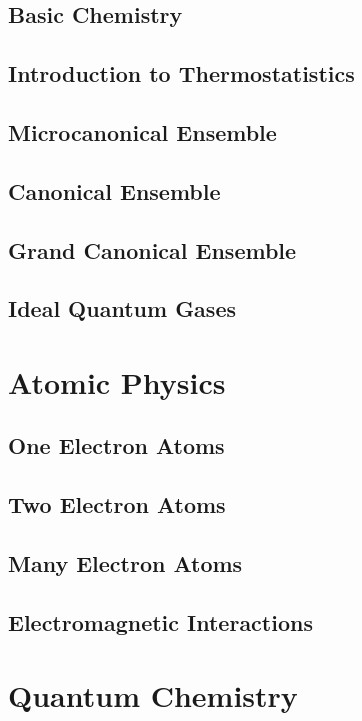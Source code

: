 \documentclass[a4paper, 11pt]{book}
\newcommand{\1}{\opr{\mathds{1}}}
\begin{document}
	\chapter{Basic Chemistry}
		
	\chapter{Introduction to Thermostatistics}
		
	\chapter{Microcanonical Ensemble}
		
	\chapter{Canonical Ensemble}
		
	\chapter{Grand Canonical Ensemble}
		
	\chapter{Ideal Quantum Gases}
		
\part{Atomic Physics}
	\chapter{One Electron Atoms}
		
	\chapter{Two Electron Atoms}
		
	\chapter{Many Electron Atoms}
		
	\chapter{Electromagnetic Interactions}
		
\part{Quantum Chemistry}
\end{document}
